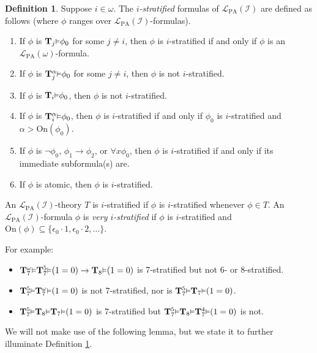 \documentclass[reqno]{article}
\theoremstyle{definition}
\newtheorem{definition}[theorem]{Definition}
\def\L{\mathscr{L}}
\def\T{\mathbf{T}}
\def\LPA{\L_{\mathrm{PA}}}
\def\indset{\mathcal I}
\def\onset{\mathrm{On}}
\renewcommand{\Pr}[1]{\T_{#1}\mbox{\small${\vDash}$}}
\newcommand{\Prr}[2]{\T^{#1}_{#2}\mbox{\small${\vDash}$}}
\begin{document}
\begin{definition}
\label{IStratifiedDefinition}
Suppose $i\in\omega$.
The \emph{$i$-stratified} formulas of $\LPA(\indset)$ are defined as follows (where $\phi$ ranges over $\LPA(\indset)$-formulas).
\begin{enumerate}
\item If $\phi$ is $\Pr j\phi_0$ for some $j\not=i$, then $\phi$ is $i$-stratified if and only if $\phi$ is an $\LPA(\omega)$-formula.
\item If $\phi$ is $\Prr\alpha j\phi_0$ for some $j\not=i$, then $\phi$ is not $i$-stratified.
\item If $\phi$ is $\Pr i\phi_0$, then $\phi$ is not $i$-stratified.
\item If $\phi$ is $\Prr\alpha i\phi_0$, then $\phi$ is $i$-stratified if and only if $\phi_0$ is $i$-stratified and
$\alpha>\onset(\phi_0)$.
\item If $\phi$ is $\neg\phi_0$, $\phi_1\rightarrow\phi_2$, or $\forall x\phi_0$,
then $\phi$ is $i$-stratified if and only if its immediate subformula(s) are.
\item If $\phi$ is atomic, then $\phi$ is $i$-stratified.
\end{enumerate}
An $\LPA(\indset)$-theory $T$ is $i$-stratified if $\phi$ is $i$-stratified whenever $\phi\in T$.
An $\LPA(\indset)$-formula $\phi$ is \emph{very $i$-stratified} if $\phi$ is $i$-stratified
and $\onset(\phi)\subseteq\{\epsilon_0\cdot 1,\epsilon_0\cdot 2,\ldots\}$.
\end{definition}

For example:
\begin{itemize}
\item $\Prr{\omega}7 \Prr 5 7(1=0)\rightarrow \Pr 8(1=0)$ is $7$-stratified but not $6$- or $8$-stratified.
\item $\Prr 5 7 \Prr\omega 7(1=0)$ is not $7$-stratified, nor is $\Prr 5 7 \Pr 7(1=0)$.
\item $\Prr 5 7 \Pr 8 \Pr 7(1=0)$ is $7$-stratified but $\Prr 5 7 \Pr 8 \Prr 4 7(1=0)$ is not.
\end{itemize}

We will not make use of the following lemma, but we state it to further illuminate
Definition \ref{IStratifiedDefinition}.
\end{document}
